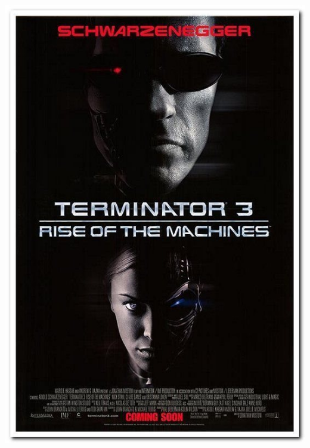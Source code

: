 \begin{frame}
\begin{columns}
\begin{column}{0.4\textwidth}
            \includegraphics[height=0.8\textheight]{img/posters/terminator_3.jpg}
        \end{column}
    \end{columns}
\end{frame}

